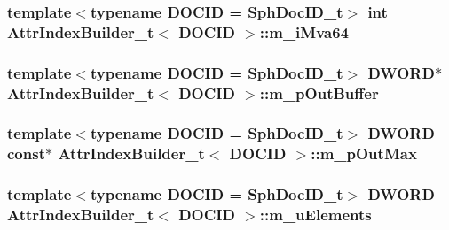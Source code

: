 \hypertarget{classAttrIndexBuilder__t_a7f12212b7c460eb36bb40b39b459f3de}{
\subsubsection[{m\-\_\-i\-Mva64}]{\setlength{\rightskip}{0pt plus 5cm}template$<$typename D\-O\-C\-I\-D  = Sph\-Doc\-I\-D\-\_\-t$>$ {\bf int} {\bf Attr\-Index\-Builder\-\_\-t}$<$ D\-O\-C\-I\-D $>$\-::m\-\_\-i\-Mva64\hspace{0.3cm}{\ttfamily [private]}}}\label{classAttrIndexBuilder__t_a7f12212b7c460eb36bb40b39b459f3de}
\hypertarget{classAttrIndexBuilder__t_ab3d8486dbc0c32dd6a4f7791658d96b2}{
\subsubsection[{m\-\_\-p\-Out\-Buffer}]{\setlength{\rightskip}{0pt plus 5cm}template$<$typename D\-O\-C\-I\-D  = Sph\-Doc\-I\-D\-\_\-t$>$ {\bf D\-W\-O\-R\-D}$\ast$ {\bf Attr\-Index\-Builder\-\_\-t}$<$ D\-O\-C\-I\-D $>$\-::m\-\_\-p\-Out\-Buffer\hspace{0.3cm}{\ttfamily [private]}}}\label{classAttrIndexBuilder__t_ab3d8486dbc0c32dd6a4f7791658d96b2}
\hypertarget{classAttrIndexBuilder__t_a41bf49c1c105aac8f17b8d84c8247c20}{
\subsubsection[{m\-\_\-p\-Out\-Max}]{\setlength{\rightskip}{0pt plus 5cm}template$<$typename D\-O\-C\-I\-D  = Sph\-Doc\-I\-D\-\_\-t$>$ {\bf D\-W\-O\-R\-D} const$\ast$ {\bf Attr\-Index\-Builder\-\_\-t}$<$ D\-O\-C\-I\-D $>$\-::m\-\_\-p\-Out\-Max\hspace{0.3cm}{\ttfamily [private]}}}\label{classAttrIndexBuilder__t_a41bf49c1c105aac8f17b8d84c8247c20}
\hypertarget{classAttrIndexBuilder__t_aa00b7e274246ea48a0c8238888206754}{
\subsubsection[{m\-\_\-u\-Elements}]{\setlength{\rightskip}{0pt plus 5cm}template$<$typename D\-O\-C\-I\-D  = Sph\-Doc\-I\-D\-\_\-t$>$ {\bf D\-W\-O\-R\-D} {\bf Attr\-Index\-Builder\-\_\-t}$<$ D\-O\-C\-I\-D $>$\-::m\-\_\-u\-Elements\hspace{0.3cm}{\ttfamily [private]}}}\label{classAttrIndexBuilder__t_aa00b7e274246ea48a0c8238888206754}

